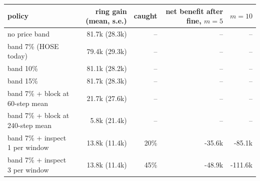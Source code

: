 \begin{tabular}{lrrrr}
\toprule
policy & ring gain (mean, s.e.) & caught & net benefit after fine, $m=5$ & $m=10$ \\
\midrule
no price band & 81.7k (28.3k) & -- & -- & -- \\
band 7\% (HOSE today) & 79.4k (29.3k) & -- & -- & -- \\
band 10\% & 81.1k (28.2k) & -- & -- & -- \\
band 15\% & 81.7k (28.3k) & -- & -- & -- \\
band 7\% + block at 60-step mean & 21.7k (27.6k) & -- & -- & -- \\
band 7\% + block at 240-step mean & 5.8k (21.4k) & -- & -- & -- \\
band 7\% + inspect 1 per window & 13.8k (11.4k) & 20\% & -35.6k & -85.1k \\
band 7\% + inspect 3 per window & 13.8k (11.4k) & 45\% & -48.9k & -111.6k \\
\bottomrule
\end{tabular}
